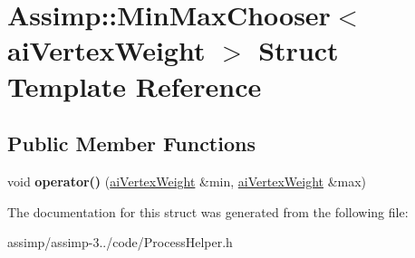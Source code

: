 \hypertarget{struct_assimp_1_1_min_max_chooser_3_01ai_vertex_weight_01_4}{\section{Assimp\+:\+:Min\+Max\+Chooser$<$ ai\+Vertex\+Weight $>$ Struct Template Reference}
\label{struct_assimp_1_1_min_max_chooser_3_01ai_vertex_weight_01_4}
}
\subsection*{Public Member Functions}
\begin{DoxyCompactItemize}
\item 
\hypertarget{struct_assimp_1_1_min_max_chooser_3_01ai_vertex_weight_01_4_a04d54ab6d33f939e41589d0d5c1f4ada}{void {\bfseries operator()} (\hyperlink{structai_vertex_weight}{ai\+Vertex\+Weight} \&min, \hyperlink{structai_vertex_weight}{ai\+Vertex\+Weight} \&max)}\label{struct_assimp_1_1_min_max_chooser_3_01ai_vertex_weight_01_4_a04d54ab6d33f939e41589d0d5c1f4ada}

\end{DoxyCompactItemize}


The documentation for this struct was generated from the following file\+:\begin{DoxyCompactItemize}
\item 
assimp/assimp-\/3../code/Process\+Helper.\+h\end{DoxyCompactItemize}
